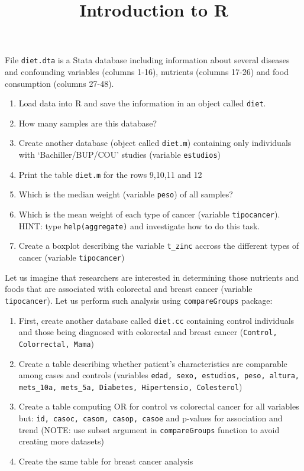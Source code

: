 \documentclass[11pt]{article}
\begin{document}
\title{\bf Introduction to R}
\date{}


\maketitle




 File {\tt diet.dta} is a Stata database including information about several diseases and confounding variables (columns 1-16), nutrients (columns 17-26) and food consumption (columns 27-48). 

 
\begin{enumerate}
 \item Load data into R and save the information in an object called {\tt diet}.
 \item How many samples are this database?
 \item Create another database (object called {\tt diet.m}) containing only individuals with `Bachiller/BUP/COU' studies (variable {\tt estudios})
 \item Print the table {\tt diet.m} for the rows 9,10,11 and 12
 \item Which is the median weight (variable {\tt peso}) of all samples?
 \item Which is the mean weight of each type of cancer (variable {\tt tipocancer}). HINT: type {\tt help(aggregate)} and investigate how to do this task.
 \item Create a boxplot describing the variable {\tt t\_zinc} accross the different types of cancer (variable {\tt tipocancer})
\end{enumerate}
 
\bigskip


 Let us imagine that researchers are interested in determining those nutrients and foods that are associated with colorectal and breast cancer (variable {\tt tipocancer}). Let us perform such analysis using {\tt compareGroups} package:


\begin{enumerate}
 \item First, create another database called {\tt diet.cc} containing control individuals and those being diagnosed with colorectal and breast cancer ({\tt Control, Colorrectal, Mama})
 \item Create a table describing whether patient's characteristics are comparable among cases and controls (variables {\tt edad,  sexo, estudios, peso, altura, mets\_10a, mets\_5a, Diabetes, Hipertensio, Colesterol})  
 \item Create a table computing OR for control vs colorectal cancer for all variables but: {\tt id, casoc, casom, casop, casoe} and p-values for association and trend (NOTE: use subset argument in {\tt compareGroups} function to avoid creating more datasets)
 \item Create the same table for breast cancer analysis 
 \end{enumerate}
\end{document}
